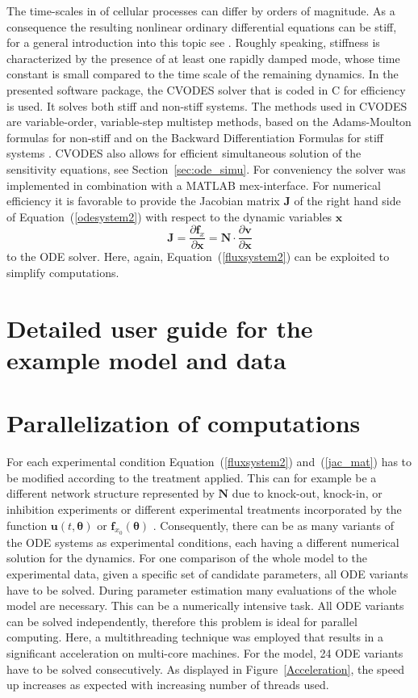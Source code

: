 \documentclass[12pt,a4paper]{scrartcl}
\newcommand{\dd}[2]{\frac{\partial #1}{\partial #2}}
\begin{document}
The time-scales in of cellular processes can differ by orders of magnitude. As a consequence the resulting nonlinear ordinary differential equations can be stiff, for a general introduction into this topic see \citet{Lambert:1977fk}. Roughly speaking, stiffness is characterized by the presence of at least one rapidly damped mode, whose time constant is small compared to the time scale of the remaining dynamics. In the presented software package, the CVODES solver \citep{Hindmarsh:2005fb} that is coded in C for efficiency is used. It solves both stiff and non-stiff systems. The methods used in CVODES are variable-order, variable-step multistep methods, based on the Adams-Moulton formulas for non-stiff and on the Backward Differentiation Formulas for stiff systems \citep{Byrne:1975uq}. CVODES also allows for efficient simultaneous solution of the sensitivity equations, see Section~\ref{sec:ode_simu}. For conveniency the solver was implemented in combination with a MATLAB mex-interface. For numerical efficiency it is favorable to provide the Jacobian matrix $\mathbf{J}$ of the right hand side of Equation~(\ref{odesystem2}) with respect to the dynamic variables $\mathbf{x}$ 
\begin{equation}
	\mathbf{J} = \dd{\mathbf{f}_{x}}{\mathbf{x}} = \mathbf{N} \cdot \dd{\mathbf{v}}{\mathbf{x}}\label{jac_mat}
\end{equation}
to the ODE solver. Here, again, Equation~(\ref{fluxsystem2}) can be exploited to simplify computations.

\section{Detailed user guide for the \citet{Raia:2011vn} example model and data} \label{user_guide}

\section{Parallelization of computations} \label{sec:parallel}
For each experimental condition Equation~(\ref{fluxsystem2}) and~(\ref{jac_mat}) has to be modified according to the treatment applied. This can for example be a different network structure represented by $\mathbf{N}$ due to knock-out, knock-in, or inhibition experiments or different experimental treatments incorporated by the function $\mathbf{u}(t, \boldsymbol{\theta})$ or $\mathbf{f}_{x_0}(\boldsymbol{\theta})$ . Consequently, there can be as many variants of the ODE systems as experimental conditions, each having a different numerical solution for the dynamics. For one comparison of the whole model to the experimental data, given a specific set of candidate parameters, all ODE variants have to be solved. During parameter estimation many evaluations of the whole model are necessary. This can be a numerically intensive task. All ODE variants can be solved independently, therefore this problem is ideal for parallel computing. Here, a multithreading technique was employed that results in a significant acceleration on multi-core machines. For the \citet{Bachmann:2011fk} model, 24 ODE variants have to be solved consecutively. As displayed in Figure~\ref{Acceleration}, the speed up increases as expected with increasing number of threads used.
\end{document}
